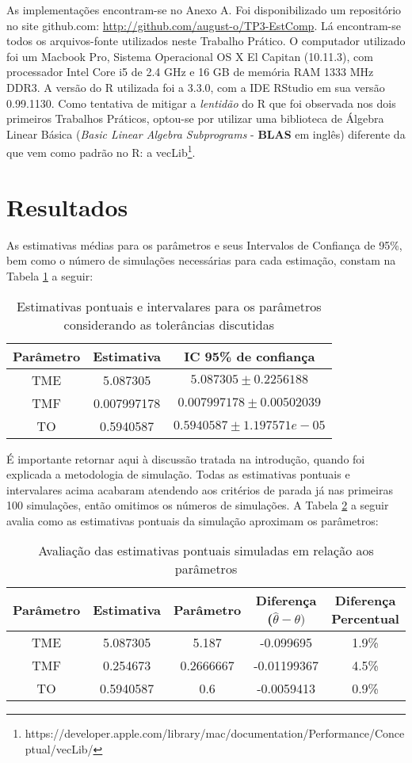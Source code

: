 \documentclass[a4paper,12pt,english,brazil]{article}
\begin{document}
    As implementações encontram-se no Anexo A. Foi disponibilizado um repositório no site github.com: \url{http://github.com/august-o/TP3-EstComp}. Lá encontram-se todos os arquivos-fonte utilizados neste Trabalho Prático. O computador utilizado foi um Macbook Pro, Sistema Operacional OS X El Capitan (10.11.3), com processador Intel Core i5 de 2.4 GHz e 16 GB de memória RAM 1333 MHz DDR3. A versão do R utilizada foi a 3.3.0, com a IDE RStudio em sua versão 0.99.1130. Como tentativa de mitigar a \textit{lentidão} do R que foi observada nos dois primeiros Trabalhos Práticos, optou-se por utilizar uma biblioteca de Álgebra Linear Básica (\textit{Basic Linear Algebra Subprograms} - \textbf{BLAS} em inglês) diferente da que vem como padrão no R: a vecLib\footnote{https://developer.apple.com/library/mac/documentation/Performance/Conceptual/vecLib/}.   

\section{Resultados}

As estimativas médias para os parâmetros e seus Intervalos de Confiança de 95\%, bem como o número de simulações necessárias para cada estimação, constam na Tabela \ref{tab:ests} a seguir:


\begin{table}[!htb]\centering
\begin{tabular}{ c |c| c}
Parâmetro & Estimativa & IC 95\% de confiança  \\ \hline
 TME & 5.087305 &  $5.087305 \pm 0.2256188$  \\  
 TMF & 0.007997178 & $0.007997178 \pm 0.00502039$ \\
 TO & 0.5940587 &  $0.5940587 \pm 1.197571e-05$\\

\end{tabular}
\caption{Estimativas pontuais e intervalares para os parâmetros considerando as tolerâncias discutidas}\label{tab:ests}
\end{table}

É importante retornar aqui à discussão tratada na introdução, quando foi explicada a metodologia de simulação. Todas as estimativas pontuais e intervalares acima acabaram atendendo aos critérios de parada já nas primeiras 100 simulações, então omitimos os números de simulações. A Tabela \ref{tab:aval} a seguir avalia como as estimativas pontuais da simulação aproximam os parâmetros:
\begin{table}[!htb]\centering
\begin{tabular}{ c |c| c|c|c}
Parâmetro & Estimativa & Parâmetro & Diferença ($\hat{\theta} - \theta)$ & Diferença Percentual \\ \hline
 TME & 5.087305 &  5.187 & -0.099695 & 1.9\% \\  
 TMF & 0.254673 & 0.2666667& -0.01199367& 4.5\% \\
 TO & 0.5940587 &  0.6 & -0.0059413 & 0.9\%\\

\end{tabular}
\caption{Avaliação das estimativas pontuais simuladas em relação aos parâmetros}\label{tab:aval}
\end{table}
\end{document}
